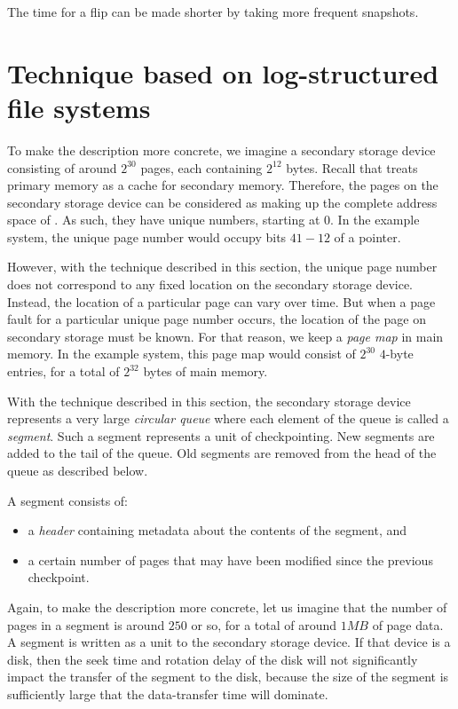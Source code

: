 The time for a flip can be made shorter by taking more frequent
snapshots.


\section{Technique based on log-structured file systems}

To make the description more concrete, we imagine a secondary storage
device consisting of around $2^{30}$ pages, each containing $2^{12}$
bytes.  Recall that \sysname{} treats primary memory as a cache for
secondary memory.  Therefore, the pages on the secondary storage
device can be considered as making up the complete address space of
\sysname{}.  As such, they have unique numbers, starting at $0$.
In the example system, the unique page number would occupy bits $41 -
12$ of a pointer.

However, with the technique described in this section, the unique page
number does not correspond to any fixed location on the secondary
storage device.  Instead, the location of a particular page can vary
over time.  But when a page fault for a particular unique page number
occurs, the location of the page on secondary storage must be known.
For that reason, we keep a \emph{page map} in main memory.  In the
example system, this page map would consist of $2^{30}$ $4$-byte
entries, for a total of $2^{32}$ bytes of main memory.

With the technique described in this section, the secondary storage
device represents a very large \emph{circular queue} where each
element of the queue is called a \emph{segment}.  Such a segment
represents a unit of checkpointing.  New segments are added to the
tail of the queue.  Old segments are removed from the head of the
queue as described below.

A segment consists of:

\begin{itemize}
\item a \emph{header} containing metadata about the contents of the
  segment, and
\item a certain number of pages that may have been modified since the
  previous checkpoint.
\end{itemize}

Again, to make the description more concrete, let us imagine that the
number of pages in a segment is around $250$ or so, for a total of
around $1MB$ of page data.  A segment is written as a unit to the
secondary storage device.  If that device is a disk, then the seek
time and rotation delay of the disk will not significantly impact the
transfer of the segment to the disk, because the size of the segment
is sufficiently large that the data-transfer time will dominate.

